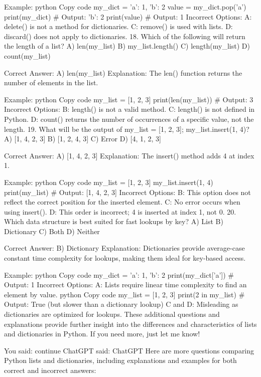 Example:
python
Copy code
my_dict = {'a': 1, 'b': 2}
value = my_dict.pop('a')
print(my_dict)  # Output: {'b': 2}
print(value)    # Output: 1
Incorrect Options:
A: delete() is not a method for dictionaries.
C: remove() is used with lists.
D: discard() does not apply to dictionaries.
18. Which of the following will return the length of a list?
A) len(my_list)
B) my_list.length()
C) length(my_list)
D) count(my_list)

Correct Answer: A) len(my_list)
Explanation: The len() function returns the number of elements in the list.

Example:
python
Copy code
my_list = [1, 2, 3]
print(len(my_list))  # Output: 3
Incorrect Options:
B: length() is not a valid method.
C: length() is not defined in Python.
D: count() returns the number of occurrences of a specific value, not the length.
19. What will be the output of my_list = [1, 2, 3]; my_list.insert(1, 4)?
A) [1, 4, 2, 3]
B) [1, 2, 4, 3]
C) Error
D) [4, 1, 2, 3]

Correct Answer: A) [1, 4, 2, 3]
Explanation: The insert() method adds 4 at index 1.

Example:
python
Copy code
my_list = [1, 2, 3]
my_list.insert(1, 4)
print(my_list)  # Output: [1, 4, 2, 3]
Incorrect Options:
B: This option does not reflect the correct position for the inserted element.
C: No error occurs when using insert().
D: This order is incorrect; 4 is inserted at index 1, not 0.
20. Which data structure is best suited for fast lookups by key?
A) List
B) Dictionary
C) Both
D) Neither

Correct Answer: B) Dictionary
Explanation: Dictionaries provide average-case constant time complexity for lookups, making them ideal for key-based access.

Example:
python
Copy code
my_dict = {'a': 1, 'b': 2}
print(my_dict['a'])  # Output: 1
Incorrect Options:
A: Lists require linear time complexity to find an element by value.
python
Copy code
my_list = [1, 2, 3]
print(2 in my_list)  # Output: True (but slower than a dictionary lookup)
C and D: Misleading as dictionaries are optimized for lookups.
These additional questions and explanations provide further insight into the differences and characteristics of lists and dictionaries in Python. If you need more, just let me know!






You said:
continue
ChatGPT said:
ChatGPT
Here are more questions comparing Python lists and dictionaries, including explanations and examples for both correct and incorrect answers:

